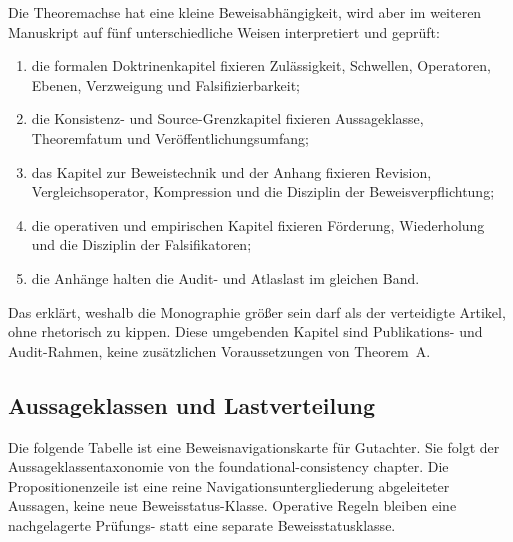 Die Theoremachse hat eine kleine Beweisabhängigkeit, wird aber im weiteren Manuskript auf fünf unterschiedliche
Weisen interpretiert und geprüft:

\begin{enumerate}
\item die formalen Doktrinenkapitel fixieren Zulässigkeit, Schwellen, Operatoren, Ebenen, Verzweigung und Falsifizierbarkeit;
\item die Konsistenz- und Source-Grenzkapitel fixieren Aussageklasse, Theoremfatum und Veröffentlichungsumfang;
\item das Kapitel zur Beweistechnik und der Anhang fixieren Revision, Vergleichsoperator, Kompression und die Disziplin der Beweisverpflichtung;
\item die operativen und empirischen Kapitel fixieren Förderung, Wiederholung und die Disziplin der Falsifikatoren;
\item die Anhänge halten die Audit- und Atlaslast im gleichen Band.
\end{enumerate}

Das erklärt, weshalb die Monographie größer sein darf als der verteidigte Artikel, ohne rhetorisch zu kippen.
Diese umgebenden Kapitel sind Publikations- und Audit-Rahmen, keine zusätzlichen Voraussetzungen von Theorem~A.

\subsection{Aussageklassen und Lastverteilung}

Die folgende Tabelle ist eine Beweisnavigationskarte für Gutachter. Sie folgt der Aussageklassentaxonomie
von the foundational-consistency chapter. Die Propositionenzeile ist eine reine
Navigationsuntergliederung abgeleiteter Aussagen, keine neue Beweisstatus-Klasse. Operative Regeln bleiben
eine nachgelagerte Prüfungs- statt eine separate Beweisstatusklasse.

